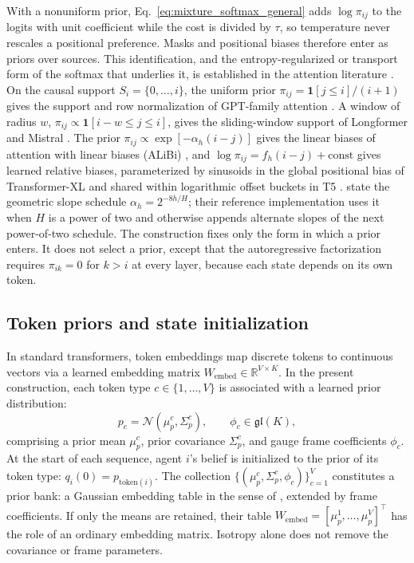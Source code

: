 \documentclass[twoside,11pt]{article}
\begin{document}
With a nonuniform prior, Eq.~\eqref{eq:mixture_softmax_general} adds $\log\pi_{ij}$ to the logits with unit coefficient while the cost is divided by $\tau$, so temperature never rescales a positional preference. Masks and positional biases therefore enter as priors over sources. This identification, and the entropy-regularized or transport form of the softmax that underlies it, is established in the attention literature \citep{Niculae2017Regularized,Litman2025EOT,Bianchessi2026BAM,Litman2026AttentionPriors}. On the causal support $S_i=\{0,\ldots,i\}$, the uniform prior $\pi_{ij}=\mathbf{1}[j\le i]/(i+1)$ gives the support and row normalization of GPT-family attention \citep{radford2019language}. A window of radius $w$, $\pi_{ij}\propto\mathbf{1}[i-w\le j\le i]$, gives the sliding-window support of Longformer and Mistral \citep{beltagy2020longformer,jiang2023mistral}. The prior $\pi_{ij}\propto\exp[-\alpha_h(i-j)]$ gives the linear biases of attention with linear biases (ALiBi) \citep{press2022train}, and $\log\pi_{ij}=f_h(i-j)+\mathrm{const}$ gives learned relative biases, parameterized by sinusoids in the global positional bias of Transformer-XL and shared within logarithmic offset buckets in T5 \citep{dai2019transformerxl,raffel2020exploring}. \citet{press2022train} state the geometric slope schedule $\alpha_h=2^{-8h/H}$; their reference implementation uses it when $H$ is a power of two and otherwise appends alternate slopes of the next power-of-two schedule. The construction fixes only the form in which a prior enters. It does not select a prior, except that the autoregressive factorization requires $\pi_{ik}=0$ for $k>i$ at every layer, because each state depends on its own token.


\subsection{Token priors and state initialization}
\label{sec:embeddings}

In standard transformers, token embeddings map discrete tokens to continuous vectors via a learned embedding matrix $W_{\text{embed}}\in\mathbb{R}^{V\times K}$. In the present construction, each token type $c \in \{1, \ldots, V\}$ is associated with a learned prior distribution:
\begin{equation}
p_c = \mathcal{N}(\mu_p^c, \Sigma_p^c), \qquad \phi_c \in \mathfrak{gl}(K),
\label{eq:prior_bank}
\end{equation}
comprising a prior mean $\mu_p^c$, prior covariance $\Sigma_p^c$, and gauge frame coefficients $\phi_c$. At the start of each sequence, agent $i$'s belief is initialized to the prior of its token type: $q_i(0) = p_{\mathrm{token}(i)}$. The collection $\{(\mu_p^c, \Sigma_p^c, \phi_c)\}_{c=1}^V$ constitutes a prior bank: a Gaussian embedding table in the sense of \citet{Vilnis2015Gaussian}, extended by frame coefficients. If only the means are retained, their table $W_{\mathrm{embed}}=[\mu_p^1,\ldots,\mu_p^V]^\top$ has the role of an ordinary embedding matrix. Isotropy alone does not remove the covariance or frame parameters.
\end{document}
